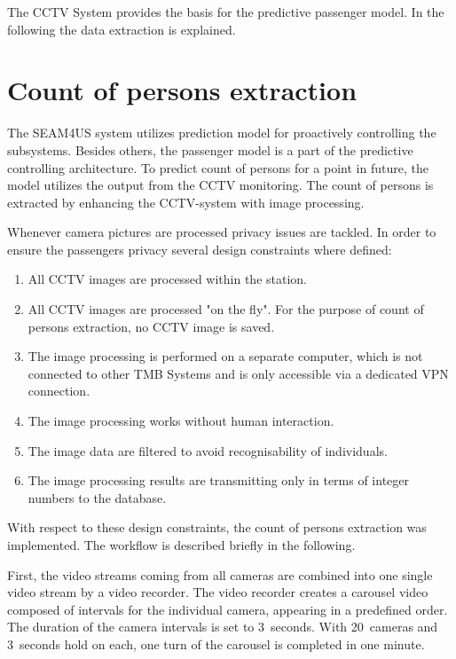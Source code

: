 The CCTV System provides the basis for the predictive passenger model. In the following the data extraction  is explained.


\section{Count of persons extraction}
\label{sec:PassengerDensityDataExtraction}

The SEAM4US system utilizes prediction model for proactively controlling the subsystems. Besides others, the passenger model is a part of the predictive controlling architecture.
To predict count of persons for a point in future, the model utilizes the output from the CCTV monitoring. The count of persons is extracted by enhancing the CCTV-system with image processing.

Whenever camera pictures are processed privacy issues are tackled. In order to ensure the passengers privacy several design constraints where defined:

\begin{enumerate}\setlength{\itemsep}{-2pt}
  \item All CCTV images are processed within the station.
  \item All CCTV images are processed "on the fly". For the purpose of count of persons extraction, no CCTV image is saved.
  \item The image processing is performed on a separate computer, which is not connected to other TMB Systems and is only accessible via a dedicated VPN connection.
  \item The image processing works without human interaction.
  \item The image data are filtered to avoid recognisability of individuals.
  \item The image processing results are transmitting only in terms of integer numbers to the database.
\end{enumerate}

With respect to these design constraints, the count of persons extraction was implemented. The workflow is described briefly in the following.

First, the video streams coming from all cameras are combined into one single video stream by a video recorder. The video recorder creates a carousel video composed of intervals for the individual camera, appearing in a predefined order. The duration of the camera intervals is set to 3~seconds. With 20~cameras and 3~seconds hold on each, one turn of the carousel is completed in one minute.

